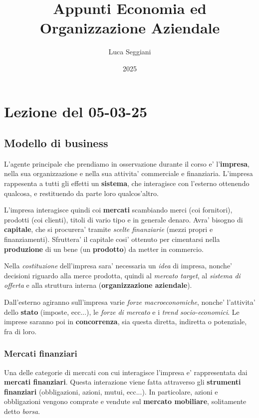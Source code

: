 \documentclass[a4paper,11pt]{article}
\title{Appunti Economia ed Organizzazione Aziendale}
\author{Luca Seggiani}
\date{2025}
\begin{document}
\section{Lezione del 05-03-25}

\thispagestyle{empty}
\pagestyle{fancy}

\subsection{Modello di business}
L'agente principale che prendiamo in osservazione durante il corso e' l'\textbf{impresa}, nella sua organizzazione e nella sua attivita' commerciale e finanziaria.
L'impresa rappesenta a tutti gli effetti un \textbf{sistema}, che interagisce con l'esterno ottenendo qualcosa, e restituendo da parte loro qualcos'altro.

L'impresa interagisce quindi coi \textbf{mercati} scambiando merci (coi fornitori), prodotti (coi clienti), titoli di vario tipo e in generale denaro.
Avra' bisogno di \textbf{capitale}, che si procurera' tramite \textit{scelte finanziarie} (mezzi propri e finanziamenti).
Sfruttera' il capitale cosi' ottenuto per cimentarsi nella \textbf{produzione} di un bene (un \textbf{prodotto}) da metter in commercio.

Nella \textit{costituzione} dell'impresa sara' necessaria un \textit{idea} di impresa, nonche' decisioni riguardo alla merce prodotta, quindi al \textit{mercato target}, al \textit{sistema di offerta} e alla struttura interna (\textbf{organizzazione aziendale}). 

Dall'esterno agiranno sull'impresa varie \textit{forze macroeconomiche}, nonche' l'attivita' dello \textbf{stato} (imposte, ecc...), le \textit{forze di mercato} e i \textit{trend socio-economici}.
Le imprese saranno poi in \textbf{concorrenza}, sia questa diretta, indiretta o potenziale, fra di loro.

\subsubsection{Mercati finanziari}
Una delle categorie di mercati con cui interagisce l'impresa e' rappresentata dai \textbf{mercati finanziari}.
Questa interazione viene fatta attraverso gli \textbf{strumenti finanziari} (obbligazioni, azioni, mutui, ecc...).
In particolare, azioni e obbligazioni vengono comprate e vendute sul \textbf{mercato mobiliare}, solitamente detto \textit{borsa}.
\end{document}
